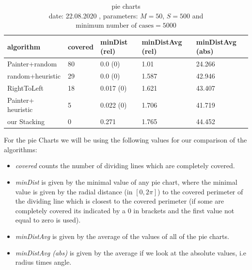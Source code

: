 \documentclass[a4paper,11pt]{article}
\begin{document}
\begin{table}[h]
  \begin{center}
    \begin{tabular}{| l || l | l | l | l |}
      \hline
      algorithm          & covered & minDist (rel)   & minDistAvg (rel) & minDistAvg (abs) \\
      \hline
      Painter+random     & 80     & 0.0 (0) & 1.01     & 24.266    \\

      random+heuristic   & 29      & 0.0 (0)   & 1.587     & 42.946     \\

      RightToLeft        & 18      & 0.017 (0) & 1.621      & 43.407     \\

      Painter+ heuristic & 5       & 0.022 (0) & 1.706      & 41.719   \\

      our Stacking       & 0       & 0.271     & 1.765      & 44.452      \\

      \hline
    \end{tabular}
  \end{center}
  \caption{pie charts\\
    date: 22.08.2020  , parameters: $M=50$, $S=500$ and $\text{minimum number of cases}=5000$  }

\end{table}
For the pie Charts we will be using the following values for our comparison of the algorithms:
\begin{itemize}
  \item \textit{covered} counts the number of dividing lines which are completely covered.
  \item \textit{minDist} is given by the minimal value of any pie chart, where the minimal value is given by the radial distance (in $[0,2\pi]$) to the covered perimeter of the dividing line which is closest to the covered perimeter (if some are completely covered its indicated by a 0 in brackets and the first value not equal to zero is used).
  \item \textit{minDistAvg} is given by the average of the values of all of the pie charts.
  \item \textit{minDistAvg (abs)} is given by the average if we look at the absolute values, i.e radius times angle.
\end{itemize}
\end{document}
